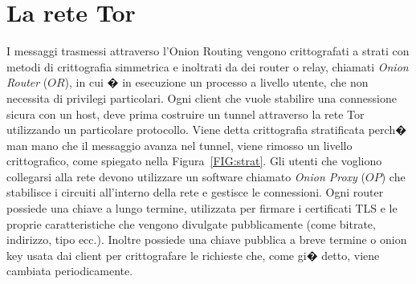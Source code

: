 \chapter{La rete Tor}
I messaggi trasmessi attraverso l'Onion Routing vengono crittografati a strati con metodi di crittografia simmetrica e inoltrati da dei router o relay, chiamati \emph{Onion Router} ($OR$), in cui � in esecuzione un processo a livello utente, che non necessita di privilegi particolari. Ogni client che vuole stabilire una connessione sicura con un host, deve prima costruire un tunnel attraverso la rete Tor utilizzando un particolare protocollo. Viene detta crittografia stratificata perch� man mano che il messaggio avanza nel tunnel, viene rimosso un livello crittografico, come spiegato nella Figura~\ref{FIG:strat}. Gli utenti che vogliono collegarsi alla rete devono utilizzare un software chiamato \emph{Onion Proxy} ($OP$) che stabilisce i circuiti all'interno della rete e gestisce le connessioni. Ogni router possiede una chiave a lungo termine, utilizzata per firmare i certificati TLS e le proprie caratteristiche che vengono divulgate pubblicamente (come bitrate, indirizzo, tipo ecc.). Inoltre possiede una chiave pubblica a breve termine o onion key usata dai client per crittografare le richieste che, come gi� detto, viene cambiata periodicamente. 

